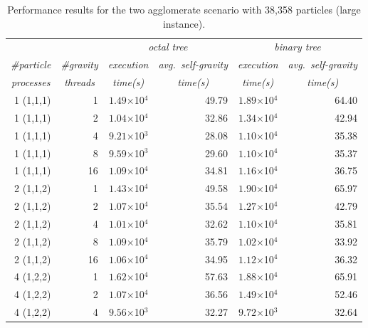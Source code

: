 \documentclass[runningheads]{llncs}
\begin{document}
\begin{table}[!t]
\small
\setlength{\belowcaptionskip}{3pt}
\centering
\caption{Performance results for the two agglomerate scenario with 38,358 particles (large instance).}
\setlength{\tabcolsep}{4.75pt}
\begin{tabular}{r r r r r r}
    \toprule
        & & \multicolumn{2}{c}{\textit{octal tree}} & \multicolumn{2}{c}{\textit{binary tree}} \\
	\cmidrule(lr){3-4}\cmidrule(lr){5-6}
       \multicolumn{1}{c}{\textit{\#particle}} & \multicolumn{1}{c}{\textit{\#gravity}} & \multicolumn{1}{c}{\textit{execution}} & \multicolumn{1}{c}{\textit{avg.~self-gravity}} & \multicolumn{1}{c}{\textit{execution}} & \multicolumn{1}{c}{\textit{avg.~self-gravity}} \\
	\multicolumn{1}{c}{\textit{processes}} & \multicolumn{1}{c}{\textit{threads}} & \multicolumn{1}{c}{\textit{time(s)}} & \multicolumn{1}{c}{\textit{time(s)}} & \multicolumn{1}{c}{\textit{time(s)}} & \multicolumn{1}{c}{\textit{time(s)}}\\
  	\midrule
    1 (1,1,1) & 1 & $1.49$$\times$10$^4$ & 49.79 & $1.89$$\times$10$^4$ & 64.40 \\
  	1 (1,1,1) & 2 & $1.04$$\times$10$^4$ & 32.86  & $1.34$$\times$10$^4$ & 42.94\\
  	1 (1,1,1) & 4 & $9.21$$\times$10$^3$ & 28.08 & $1.10$$\times$10$^4$ & 35.38\\
  	1 (1,1,1) & 8 & $9.59$$\times$10$^3$ & 29.60 & $1.10$$\times$10$^4$ & 35.37\\
  	1 (1,1,1) & 16 & $1.09$$\times$10$^4$ & 34.81 & $1.16$$\times$10$^4$ & 36.75\\
    2 (1,1,2) & 1 & $1.43$$\times$10$^4$ & 49.58 & $1.90$$\times$10$^4$ & 65.97\\
    2 (1,1,2) & 2 & $1.07$$\times$10$^4$ & 35.54 & $1.27$$\times$10$^4$ & 42.79\\
    2 (1,1,2) & 4 & $1.01$$\times$10$^4$ & 32.62 & $1.10$$\times$10$^4$ & 35.81\\
    2 (1,1,2) & 8 & $1.09$$\times$10$^4$ & 35.79 & $1.02$$\times$10$^4$ & 33.92\\
    2 (1,1,2) & 16 & $1.06$$\times$10$^4$ & 34.95 & $1.12$$\times$10$^4$ & 36.32\\
    4 (1,2,2) & 1 & $1.62$$\times$10$^4$ & 57.63 & $1.88$$\times$10$^4$ & 65.91\\
    4 (1,2,2) & 2 & $1.07$$\times$10$^4$ & 36.56 & $1.49$$\times$10$^4$ & 52.46\\
    4 (1,2,2) & 4 & $9.56$$\times$10$^3$ & 32.27 & $9.72$$\times$10$^3$ & 32.64\\

\end{tabular}
\end{table}
\end{document}
